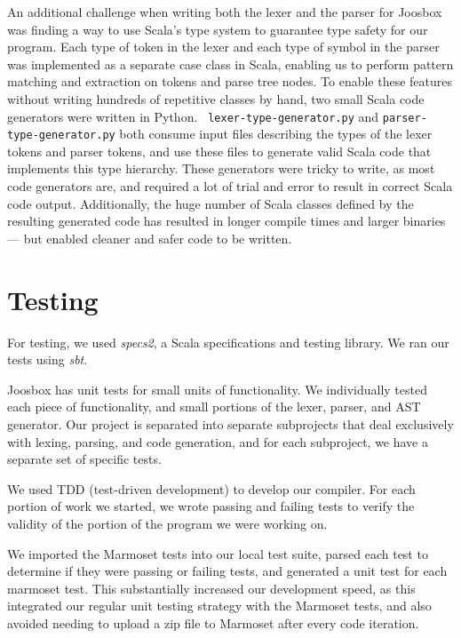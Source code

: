 \documentclass[letterpaper]{article}
\begin{document}
  An additional challenge when writing both the lexer and the parser for Joosbox
  was finding a way to use Scala's type system to guarantee type safety for our
  program. Each type of token in the lexer and each type of symbol in the parser
  was implemented as a separate case class in Scala, enabling us to perform
  pattern matching and extraction on tokens and parse tree nodes. To enable
  these features without writing hundreds of repetitive classes by hand, two
  small Scala code generators were written in Python.  {\tt
  lexer-type-generator.py} and {\tt parser-type-generator.py} both consume input
  files describing the types of the lexer tokens and parser tokens, and use
  these files to generate valid Scala code that implements this type hierarchy.
  These generators were tricky to write, as most code generators are, and
  required a lot of trial and error to result in correct Scala code output.
  Additionally, the huge number of Scala classes defined by the resulting
  generated code has resulted in longer compile times and larger binaries ---
  but enabled cleaner and safer code to be written.

  \section{Testing}

  For testing, we used {\em specs2}, a Scala specifications and testing library.
  We ran our tests using {\em sbt}.

  Joosbox has unit tests for small units of functionality. We individually
  tested each piece of functionality, and small portions of the lexer, parser,
  and AST generator. Our project is separated into separate subprojects that
  deal exclusively with lexing, parsing, and code generation, and for each
  subproject, we have a separate set of specific tests.

  We used TDD (test-driven development) to develop our compiler. For each
  portion of work we started, we wrote passing and failing tests to verify the
  validity of the portion of the program we were working on.

  We imported the Marmoset tests into our local test suite, parsed each test to
  determine if they were passing or failing tests, and generated a unit test for
  each marmoset test. This substantially increased our development speed, as
  this integrated our regular unit testing strategy with the Marmoset tests, and
  also avoided needing to upload a zip file to Marmoset after every code
  iteration.
\end{document}
